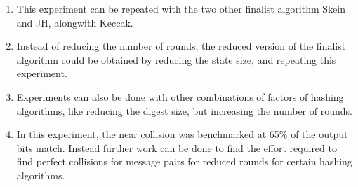 \begin{enumerate}
\item This experiment can be repeated with the two other finalist algorithm Skein and JH, alongwith Keccak.
\item Instead of reducing the number of rounds, the reduced version of the finalist algorithm could be obtained
by reducing the state size, and repeating this experiment.
\item Experiments can also be done with other combinations of factors of hashing algorithms, like reducing the
digest size, but increasing the number of rounds.
\item In this experiment, the near collision was benchmarked at 65\% of the output bits match. Instead further work
can be done to find the effort required to find perfect collisions for message pairs for reduced rounds for
certain hashing algorithms.
\end{enumerate}
